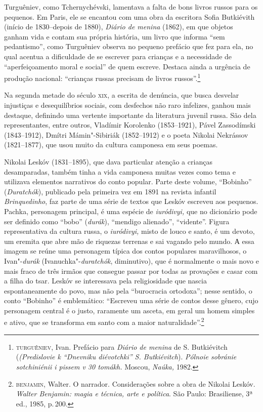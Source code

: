 Turguêniev, como Tchernychévski, lamentava a falta de bons livros russos
para os pequenos. Em Paris, ele se encantou com uma obra da escritora
Sofia Butkiévith (início de 1830--depois de 1880), \emph{Diário de
menina} (1862), em que objetos ganham vida e contam sua própria
história, um livro que informa ``sem pedantismo'', como Turguêniev
observa no pequeno prefácio que fez para ela, no qual acentua a
dificuldade de se escrever para crianças e a necessidade de
``aperfeiçoamento moral e social'' de quem escreve. Destaca ainda a
urgência de produção nacional: ``crianças russas precisam de livros
russos''.\footnote{\textsc{turguêniev}, Ivan. Prefácio para \emph{Diário de menina}
  de S. Butkiévitch (\emph{(Predislovie k “Dnevniku diévotchki” S. Butkiévitch}). \emph{Pólnoie sobránie sotchiniénii i pissem v 30 tomákh.} Moscou,
  \emph{Naúka,} 1982.}

Na segunda metade do século \textsc{xix}, a escrita de denúncia, que busca
desvelar injustiças e desequilíbrios sociais, com desfechos não raro
infelizes, ganhou mais destaque, definindo uma vertente importante da
literatura juvenil russa. São dela representantes, entre outros,
Vladímir Korolenko (1853--1921), Pável Zassodímski (1843--1912), Dmítri
Mámin"-Sibiriák (1852--1912) e o poeta Nikolai Nekrássov (1821--1877),
que usou muito da cultura camponesa em seus poemas.

Nikolai Leskóv (1831--1895), que dava particular atenção a crianças desamparadas,
também tinha a vida camponesa muitas vezes como tema e utilizava
elementos narrativos do conto popular. Parte deste volume, ``Bobinho''
(\emph{Duratchók}), publicado pela primeira vez em 1891 na revista
infantil \emph{Brinquedinho}, faz parte de uma série de textos que
Leskóv escreveu aos pequenos. Pachka, personagem principal, é uma
espécie de \emph{iuródivyi,} que no dicionário pode ser definido como
``bobo'' (\emph{durák}), ``mendigo alienado'', ``vidente''. Figura
representativa da cultura russa, o \emph{iuródivyi,} misto de louco e
santo, é um devoto, um eremita que abre mão de riquezas terrenas e sai
vagando pelo mundo. А essa imagem se reúne uma personagem típica dos
contos populares maravilhosos, o Ivan"-\emph{durák}
(Ivanuchka"-\emph{duratchók}, diminutivo), que é normalmente o mais novo e mais fraco
de três irmãos que consegue passar por todas as provações e casar com a
filha do tsar. Leskóv se interessava pela religiosidade que nascia
espontaneamente do povo, mas não pela ``burocracia ortodoxa''; nesse
sentido, o conto ``Bobinho'' é emblemático: ``Escreveu uma série de
contos desse gênero, cujo personagem central é o justo, raramente um
asceta, em geral um homem simples e ativo, que se transforma em santo
com a maior naturalidade''.\footnote{\textsc{benjamin}, Walter. O narrador.
  Considerações sobre a obra de Nikolai Leskóv. \emph{Walter Benjamin:
  magia e técnica, arte e política}. São Paulo: Brasiliense, 3ª ed.,
  1985, p.\,200.}

